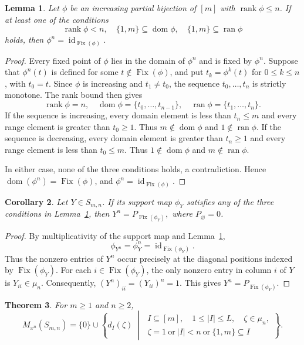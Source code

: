 \documentclass[11pt,a4paper,reqno]{amsart}
\newtheorem{theorem}{Theorem}[section]
\newtheorem{corollary}[theorem]{Corollary}
\newtheorem{lemma}[theorem]{Lemma}
\newcommand{\Sn}{S_{m,n}}
\newcommand{\Mn}{M_{x^n}}
\newcommand{\id}{\operatorname{id}}
\DeclareMathOperator{\rank}{rank}
\DeclareMathOperator{\Fix}{Fix}
\DeclareMathOperator{\dom}{dom}
\DeclareMathOperator{\ran}{ran}
\numberwithin{equation}{section}
\begin{document}
\begin{lemma}\label{lem:paths}
Let $\phi$ be an increasing partial bijection of $[m]$ with $\rank\phi\leq n$. If at least one of the conditions
\[
\rank\phi<n,\quad  \{1,m\}\subseteq\dom\phi,\quad \{1,m\}\subseteq\ran\phi
\]
holds, then $\phi^n=\id_{\Fix(\phi)}$.
\end{lemma}

\begin{proof}
Every fixed point of $\phi$ lies in the domain of $\phi^n$ and is fixed by $\phi^n$. Suppose that $\phi^n(t)$ is defined for some $t\notin\Fix(\phi)$, and put $t_k=\phi^k(t)$ for $0\leq k\leq n$, with $t_0=t$. Since $\phi$ is increasing and $t_1\neq t_0$, the sequence $t_0,\ldots,t_n$ is strictly monotone. The rank bound then gives
\[
\rank\phi=n,\quad  \dom\phi=\{t_0,\ldots,t_{n-1}\},\quad  \ran\phi=\{t_1,\ldots,t_n\}.
\]
If the sequence is increasing, every domain element is less than $t_n\leq m$ and every range element is greater than $t_0\geq 1$. Thus $m\notin\dom\phi$ and $1\notin\ran\phi$. If the sequence is
decreasing, every domain element is greater than $t_n\geq 1$ and every range element is less than $t_0\leq m$. Thus $1\notin\dom\phi$ and $m\notin\ran\phi$.

In either case, none of the three conditions holds, a contradiction. Hence $\dom(\phi^n)=\Fix(\phi)$, and $\phi^n=\id_{\Fix(\phi)}$.
\end{proof}

\begin{corollary}\label{cor:matrix-power}
Let $Y\in\Sn$. If its support map $\phi_Y$ satisfies any of the three conditions in Lemma~\ref{lem:paths}, then $Y^n=P_{\Fix(\phi_Y)},$  where $P_\varnothing=0$.
\end{corollary}

\begin{proof}
By multiplicativity of the support map and Lemma~\ref{lem:paths},
$$
\phi_{Y^n}=\phi_Y^n=\id_{\Fix(\phi_Y)}.
$$
Thus the nonzero entries of $Y^n$ occur precisely at the diagonal
positions indexed by $\Fix(\phi_Y)$. For each $i\in\Fix(\phi_Y)$,
the only nonzero entry in column $i$ of $Y$ is $Y_{ii}\in\mu_n$.
Consequently, $(Y^n)_{ii}=(Y_{ii})^n=1$. This gives
$Y^n=P_{\Fix(\phi_Y)}$.
\end{proof}


\begin{theorem}\label{thm:margin}
For $m\geq 1$ and $n\geq 2$,
\begin{equation}\label{eq:margin-formula}
\Mn(\Sn)=\{0\}\cup
\left\{
d_I(\zeta)\;\middle|\;
\begin{array}{l}
I\subseteq[m],\quad 1\leq |I|\leq L,\quad \zeta\in\mu_n,\\
\zeta=1\ \text{or}\ |I|<n\ \text{or}\ \{1,m\}\subseteq I
\end{array}
\right\}.
\end{equation}
\end{theorem}
\end{document}
